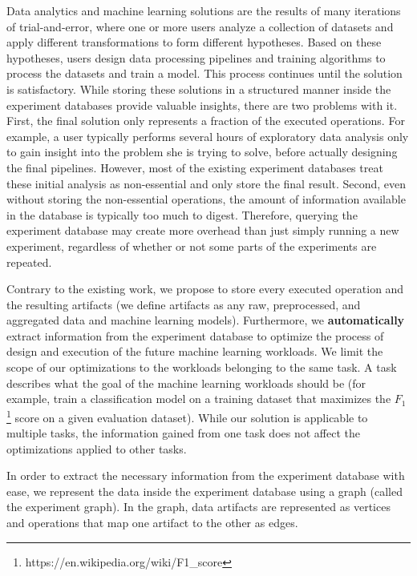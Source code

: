 Data analytics and machine learning solutions are the results of many iterations of trial-and-error, where one or more users analyze a collection of datasets and apply different transformations to form different hypotheses.
Based on these hypotheses, users design data processing pipelines and training algorithms to process the datasets and train a model.
This process continues until the solution is satisfactory. 
While storing these solutions in a structured manner inside the experiment databases provide valuable insights, there are two problems with it.
First, the final solution only represents a fraction of the executed operations.
For example, a user typically performs several hours of exploratory data analysis only to gain insight into the problem she is trying to solve, before actually designing the final pipelines.
However, most of the existing experiment databases treat these initial analysis as non-essential and only store the final result.
Second, even without storing the non-essential operations, the amount of information available in the database is typically too much to digest.
Therefore, querying the experiment database may create more overhead than just simply running a new experiment, regardless of whether or not some parts of the experiments are repeated.

Contrary to the existing work, we propose to store every executed operation and the resulting artifacts (we define artifacts as any raw, preprocessed, and aggregated data and machine learning models).
Furthermore, we \textbf{automatically} extract information from the experiment database to optimize the process of design and execution of the future machine learning workloads.
We limit the scope of our optimizations to the workloads belonging to the same task.
A task describes what the goal of the machine learning workloads should be (for example, train a classification model on a training dataset that maximizes the $F_1$\footnote{https://en.wikipedia.org/wiki/F1\_score} score on a given evaluation dataset).
While our solution is applicable to multiple tasks, the information gained from one task does not affect the optimizations applied to other tasks.

In order to extract the necessary information from the experiment database with ease, we represent the data inside the experiment database using a graph (called the experiment graph).
In the graph, data artifacts are represented as vertices and operations that map one artifact to the other as edges.

